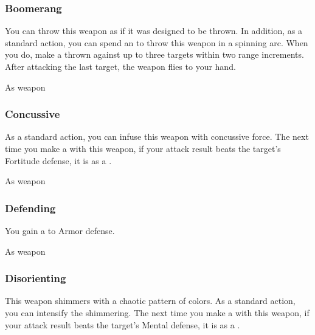 
\lowercase{\hypertarget{item:Boomerang}{}}\label{item:Boomerang}
\hypertarget{item:Boomerang}{\subsubsection{Boomerang\hfill{}}}

You can throw this weapon as if it was designed to be thrown.
In addition, as a standard action, you can spend an  to throw this weapon in a spinning arc.
When you do, make a thrown  against up to three targets within two range increments.
After attacking the last target, the weapon flies to your hand.



 As weapon


\lowercase{\hypertarget{item:Concussive}{}}\label{item:Concussive}
\hypertarget{item:Concussive}{\subsubsection{Concussive\hfill{}}}

As a standard action, you can infuse this weapon with concussive force.
The next time you make a  with this weapon, if your attack result beats the target's Fortitude defense, it is  as a .



 As weapon


\lowercase{\hypertarget{item:Defending}{}}\label{item:Defending}
\hypertarget{item:Defending}{\subsubsection{Defending\hfill{}}}

You gain a   to Armor defense.



 


 As weapon


\lowercase{\hypertarget{item:Disorienting}{}}\label{item:Disorienting}
\hypertarget{item:Disorienting}{\subsubsection{Disorienting\hfill{}}}

This weapon shimmers with a chaotic pattern of colors.
As a standard action, you can intensify the shimmering.
The next time you make a  with this weapon, if your attack result beats the target's Mental defense,
it is \disoriented as a .



